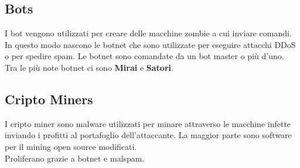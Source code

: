 \subsection{Bots}
I bot vengono utilizzati per creare delle macchine zombie a cui inviare comandi.\\
In questo modo nascono le botnet che sono utilizzate per eseguire attacchi \acrshort{DDoS} o per spedire spam.
Le botnet sono comandate da un bot master o più d'uno.\\
Tra le più note botnet ci sono \textbf{Mirai} e \textbf{Satori}.

\subsection{Cripto Miners}
I cripto miner sono malware utilizzati per minare attraverso le macchine infette inviando i profitti al portafoglio dell'attaccante.
La maggior parte sono software per il mining open source modificati.\\
Proliferano grazie a botnet e malspam.

